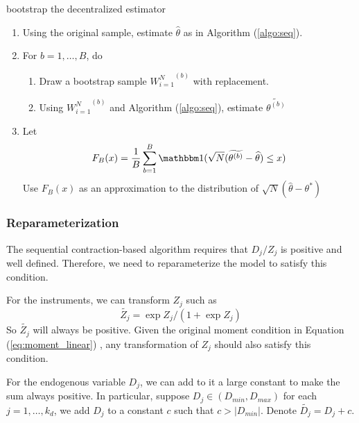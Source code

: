 \begin{algorithm}[H]\caption{bootstrap the decentralized estimator}
\label{algo:boot}

\begin{enumerate}
\item Using the original sample, estimate $\hat{\theta}$ as in Algorithm
(\ref{algo:seq}).

\item For $b=1, \ldots, B$, do

\begin{enumerate}
\item Draw a bootstrap sample ${W_{i=1}^{N}}^{(b)}$ with replacement.

\item Using ${W_{i=1}^{N}}^{(b)}$ and Algorithm (\ref{algo:seq}), estimate
$\widetilde{\theta^{(b)}}$

\end{enumerate}

\item Let $$
F_B(x) = \frac{1}{B}\sum_{b=1}^B \I(\sqrt{N}(
\widetilde{\theta^{(b)}} - \hat{\theta}) \leq x)
$$
Use $F_B(x)$ as an approximation to the distribution of $\sqrt{N}(\hat{\theta} -
\theta^*)$
\end{enumerate}

\end{algorithm}

\subsubsection{Reparameterization}	
\label{sec:reparam}
The sequential contraction-based algorithm requires that $D_j/Z_j$ is positive
and well defined. Therefore, we need to reparameterize the model to satisfy this
condition.

For the instruments, we can transform $Z_j$ such as 
$$
\tilde{Z_j} = \exp{Z_j}/(1 + \exp{Z_j})
$$
So $\tilde{Z_j}$ will always be positive. Given the original moment condition in
Equation (\ref{eq:moment_linear}) , any transformation of $Z_j$ should also
satisfy this condition.

For the endogenous variable $D_j$, we can add to it a large constant to make the
sum always positive. In particular, suppose $D_j \in (D_{min}, D_{max})$ for
each $j=1, \ldots, k_d$, we add $D_j$ to a constant $c$ such that $c >
|D_{min}|$.  Denote $\tilde{D_j} = D_j + c$.

